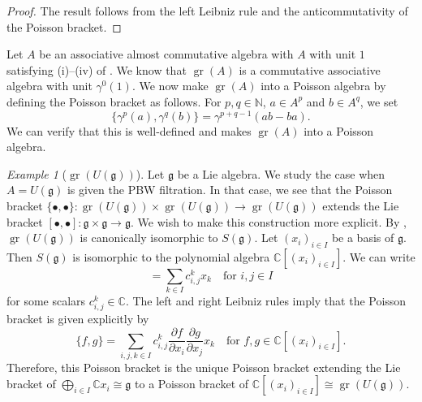 \documentclass[a4paper, 12pt, reqno]{amsart}
\theoremstyle{remark}
\newtheorem{example}[theorem]{Example}
\DeclareMathOperator{\gr}{gr}
\begin{document}
\begin{proof}
  The result follows from the left Leibniz rule and the anticommutativity of the Poisson bracket.
\end{proof}

Let $A$ be an associative almost commutative algebra with $A$ with unit $1$ satisfying (i)--(iv) of .
We know that $\gr(A)$ is a commutative associative algebra with unit $\gamma^0(1)$.
We now make $\gr(A)$ into a Poisson algebra by defining the Poisson bracket as follows.
For $p, q \in \mathbb{N}$, $a \in A^p$ and $b \in A^q$, we set
\begin{equation*}
  \{\gamma^p(a), \gamma^q(b)\} = \gamma^{p + q - 1}(ab - ba).
\end{equation*}
We can verify that this is well-defined and makes $\gr(A)$ into a Poisson algebra.

\begin{example}[$\gr(U(\mathfrak{g}))$]
  \label{exa:24}
  Let $\mathfrak{g}$ be a Lie algebra.
  We study the case when $A = U(\mathfrak{g})$ is given the PBW filtration.
  In that case, we see that the Poisson bracket $\{\bullet, \bullet\}: \gr(U(\mathfrak{g})) \times \gr(U(\mathfrak{g})) \to \gr(U(\mathfrak{g}))$ extends the Lie bracket $[\bullet, \bullet]: \mathfrak{g} \times \mathfrak{g} \to \mathfrak{g}$.
  We wish to make this construction more explicit.
  By , $\gr(U(\mathfrak{g}))$ is canonically isomorphic to $S(\mathfrak{g})$.
  Let $(x_i)_{i \in I}$ be a basis of $\mathfrak{g}$.
  Then $S(\mathfrak{g})$ is isomorphic to the polynomial algebra $\mathbb{C}[(x_i)_{i \in I}]$.
  We can write
  \begin{equation*}
    [x_i, x_j] = \sum_{k \in I}c^k_{i, j}x_k \quad \text{for $i, j \in I$}
  \end{equation*}
  for some scalars $c^k_{i, j} \in \mathbb{C}$.
  The left and right Leibniz rules imply that the Poisson bracket is given explicitly by
  \begin{equation*}
    \{f, g\} = \sum_{i, j, k \in I}c^k_{i, j}\frac{\partial f}{\partial x_i}\frac{\partial g}{\partial x_j}x_k \quad \text{for $f, g \in \mathbb{C}[(x_i)_{i \in I}]$}.
  \end{equation*}
  Therefore, this Poisson bracket is the unique Poisson bracket extending the Lie bracket of $\bigoplus_{i \in I}\mathbb{C}x_i \cong \mathfrak{g}$ to a Poisson bracket of $\mathbb{C}[(x_i)_{i \in I}] \cong \gr(U(\mathfrak{g}))$.
\end{example}
\end{document}
